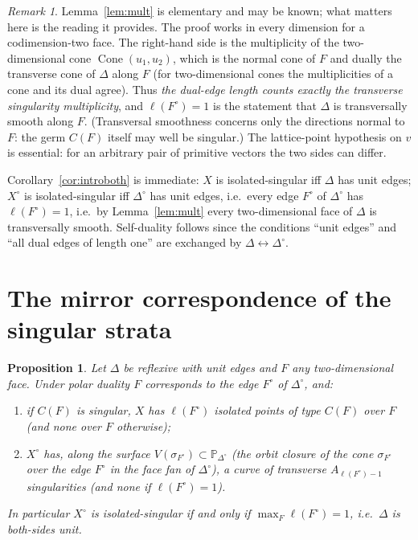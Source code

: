 \documentclass[11pt]{amsart}
\newtheorem{proposition}[theorem]{Proposition}
\theoremstyle{definition}
\theoremstyle{remark}
\newtheorem{remark}[theorem]{Remark}
\newcommand{\PP}{\mathbb{P}}
\newcommand{\Cone}{\operatorname{Cone}}
\begin{document}
\begin{remark}\label{rem:transverse}
Lemma~\ref{lem:mult} is elementary and may be known; what matters here is
the reading it provides.  The proof works in every dimension for a
codimension-two face.  The right-hand side is the multiplicity of the
two-dimensional cone $\Cone(u_1,u_2)$, which is the normal cone of $F$ and
dually the transverse cone of $\Delta$ along $F$ (for two-dimensional cones
the multiplicities of a cone and its dual agree).  Thus \emph{the dual-edge
length counts exactly the transverse singularity multiplicity}, and
$\ell(F^\circ)=1$ is the statement that $\Delta$ is transversally smooth
along $F$.  (Transversal smoothness concerns only the directions normal to
$F$: the germ $C(F)$ itself may well be singular.)  The lattice-point
hypothesis on $v$ is essential: for an
arbitrary pair of primitive vectors the two sides can differ.
\end{remark}

Corollary~\ref{cor:introboth} is immediate: $X$ is isolated-singular iff
$\Delta$ has unit edges; $X^\circ$ is isolated-singular iff $\Delta^\circ$
has unit edges, i.e.\ every edge $F^\circ$ of $\Delta^\circ$ has
$\ell(F^\circ)=1$, i.e.\ by Lemma~\ref{lem:mult} every two-dimensional face
of $\Delta$ is transversally smooth.  Self-duality follows since the
conditions ``unit edges'' and ``all dual edges of length one'' are exchanged
by $\Delta \leftrightarrow \Delta^\circ$.

\section{The mirror correspondence of the singular strata}\label{sec:corr}

\begin{proposition}\label{prop:corr}
Let $\Delta$ be reflexive with unit edges and $F$ any two-dimensional
face.  Under polar duality $F$ corresponds to the edge
$F^\circ$ of $\Delta^\circ$, and:
\begin{enumerate}
\item if $C(F)$ is singular, $X$ has $\ell(F^\circ)$ isolated points of
type $C(F)$ over $F$ (and none over $F$ otherwise);
\item $X^\circ$ has, along the surface
$V(\sigma_{F^\circ}) \subset \PP_{\Delta^\circ}$ (the orbit closure of
the cone $\sigma_{F^\circ}$ over the edge $F^\circ$ in the face fan of
$\Delta^\circ$), a curve of transverse $A_{\ell(F^\circ)-1}$
singularities (and none if $\ell(F^\circ)=1$).
\end{enumerate}
In particular $X^\circ$ is isolated-singular if and only if
$\max_F \ell(F^\circ) = 1$, i.e.\ $\Delta$ is both-sides unit.
\end{proposition}
\end{document}
